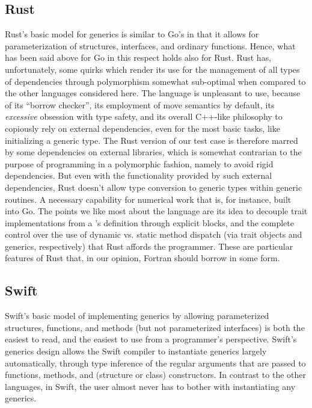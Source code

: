 \documentclass[11pt,oneside]{report}
\newcommand{\code}[1]{{\selectfont\ttfamily{#1}}}
\begin{document}
\subsection{Rust}

Rust's basic model for generics is similar to Go's in that it allows
for parameterization of structures, interfaces, and ordinary
functions. Hence, what has been said above for Go in this respect
holds also for Rust. Rust has, unfortunately, some quirks which render
its use for the management of all types of dependencies through
polymorphism somewhat sub-optimal when compared to the other languages
considered here. The language is unpleasant to use, because of its
``borrow checker'', its employment of move semantics by default, its
\emph{excessive} obsession with type safety, and its overall C++-like
philosophy to copiously rely on external dependencies, even for the
most basic tasks, like initializing a generic type. The Rust version
of our test case is therefore marred by some dependencies on external
libraries, which is somewhat contrarian to the purpose of programming
in a polymorphic fashion, namely to avoid rigid dependencies. But even
with the functionality provided by such external dependencies, Rust
doesn't allow type conversion to generic types within generic
routines. A necessary capability for numerical work that is, for
instance, built into Go. The points we like most about the language
are its idea to decouple trait implementations from a \code{struct}'s
definition through explicit \code{impl} blocks, and the complete
control over the use of dynamic vs. static method dispatch (via
trait objects and generics, respectively) that Rust affords the
programmer. These are particular features of Rust that, in our
opinion, Fortran should borrow in some form.

\subsection{Swift}

Swift's basic model of implementing generics by allowing parameterized
structures, functions, and methods (but not parameterized interfaces)
is both the easiest to read, and the easiest to use from a
programmer's perspective. Swift's generics design allows the Swift
compiler to instantiate generics largely automatically, through type
inference of the regular arguments that are passed to functions,
methods, and (structure or class) constructors. In contrast to the
other languages, in Swift, the user almost never has to bother with
instantiating any generics.
\end{document}
